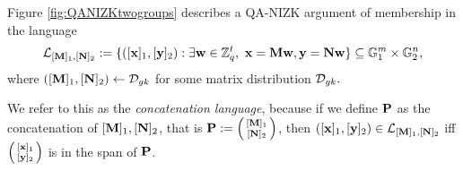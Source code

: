 Figure \ref{fig:QANIZKtwogroups} describes a QA-NIZK argument of membership in the language 
$$\mathcal{L}_{[\matr{M}]_1,[\matr{N}]_2}:=\{ ([\vecb{x}]_1,[\vecb{y}]_2): \exists \vecb{w} \in \Z_q^{t}, \ \vecb{x}=\matr{M}\vecb{w},   \vecb{y}=\matr{N}\vecb{w} \} \subseteq \GG_1^{m} \times \GG_2^{n},$$
where $([\mathbf{{M}}]_1,[\mathbf{{N}}]_2)\gets\mathcal{D}_{gk}$ for some matrix distribution $\mathcal{D}_{gk}.$

We refer to this as the \textit{concatenation language}, because 
if we define $\mathbf{{P}}$ as the concatenation of $[\mathbf{{M}}]_1,[\mathbf{{N}}]_2$, that is $\matr{P}:=\smallpmatrix{[\matr{M}]_1 \\ [\matr{N}]_2}$, then  $([\mathbf{x}]_1,[\mathbf{y}]_2) \in \mathcal{L}_{[\mathbf{{M}}]_1,[\mathbf{{N}}]_2}$ iff $\smallpmatrix{[\vecb{x}]_1 \\ [\vecb{y}]_2}$ is in the span of $\mathbf{{P}}$.
